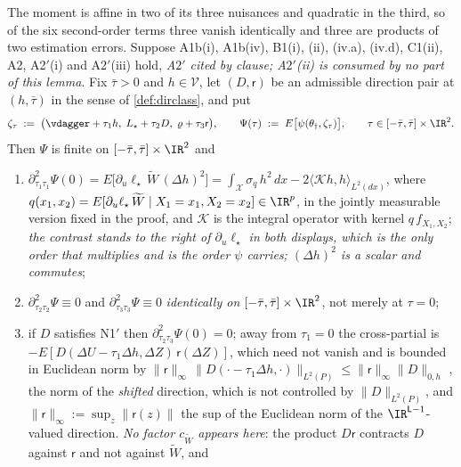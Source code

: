 \begin{lemma}\label{lem:secondord}
The moment is affine in two of its three nuisances and quadratic in the third, so of the six second-order
terms three vanish identically and three are products of two estimation errors.
Suppose A1b(i), A1b(iv), B1(i), (ii), (iv.a), (iv.d), C1(ii), A2, A2$'$(i) and A2$'$(iii) hold, \emph{A$2'$
cited by clause; A$2'$(ii) is consumed by no part of this lemma}. Fix $\bar\tau>0$ and $h\in\mathcal V$,
let $(D,\mathsf r)$ be an admissible direction pair at $(h,\bar\tau)$ in the sense of
\cref{def:dirclass}, and put
\[
\zeta_\tau\;:=\;\big(\vdagger+\tau_1h,\;L_\star+\tau_2D,\;\varrho+\tau_3\mathsf r\big),
\qquad
\Psi(\tau)\;:=\;E\big[\psi(\theta_\dagger,\zeta_\tau)\big],
\qquad
\tau\in[-\bar\tau,\bar\tau]\times\IR^{2}.
\]
Then $\Psi$ is finite on $[-\bar\tau,\bar\tau]\times\IR^{2}$ and
\begin{enumerate}
\item[(i)] $\partial^{2}_{\tau_1\tau_1}\Psi(0)=E\big[\partial_u\ell_\star\,\widetilde W\,(\Delta h)^{2}\big]
=\int_{\mathcal X}\sigma_q\,h^{2}\,dx-2\big\langle\mathcal K h,h\big\rangle_{L^{2}(dx)}$, where
$q(x_1,x_2)=E[\partial_u\ell_\star\,\widetilde W\mid X_1=x_1,X_2=x_2]\in\IR^{p}$, in the jointly measurable
version fixed in the proof, and $\mathcal K$ is the integral operator with kernel $q\,f_{X_1,X_2}$;
\emph{the contrast stands to the right of $\partial_u\ell_\star$ in both displays, which is the only
order that multiplies and is the order $\psi$ carries; $(\Delta h)^{2}$ is a scalar and commutes};
\item[(ii)] $\partial^{2}_{\tau_2\tau_2}\Psi\equiv0$ and $\partial^{2}_{\tau_3\tau_3}\Psi\equiv0$
\emph{identically on $[-\bar\tau,\bar\tau]\times\IR^{2}$}, not merely at $\tau=0$;
\item[(iii)] if $D$ satisfies N1$'$ then $\partial^{2}_{\tau_2\tau_3}\Psi(0)=0$; away
from $\tau_1=0$ the cross-partial is $-E[D(\Delta U-\tau_1\Delta h,\Delta Z)\,\mathsf r(\Delta Z)]$, which
need not vanish and is bounded in Euclidean norm by
$\|\mathsf r\|_\infty\,\big\|D(\cdot-\tau_1\Delta h,\cdot)\big\|_{L^{2}(P)}\le\|\mathsf r\|_\infty\|D\|_{0,h}$
, the norm of the \emph{shifted} direction, which is not controlled by $\|D\|_{L^{2}(P)}$, and
$\|\mathsf r\|_\infty:=\sup_z\|\mathsf r(z)\|$ the sup of the Euclidean norm of the
$\IR^{\mathsf L-1}$-valued direction. \emph{No factor $c_{\widetilde W}$ appears here}: the
product $D\mathsf r$ contracts $D$ against $\mathsf r$ and not against $\widetilde W$, and

\end{enumerate}
\end{lemma}
